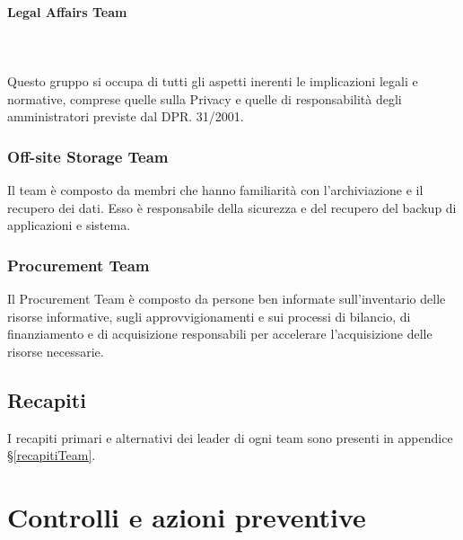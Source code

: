 \documentclass[12pt, a4paper, titlepage]{report}
\newcommand{\myparagraph}[1]{\paragraph{#1}\mbox{} \mbox{}}
\begin{document}
			\myparagraph{Legal Affairs Team}\\
			\\Questo gruppo si occupa di tutti gli aspetti inerenti le implicazioni legali e normative, comprese quelle sulla Privacy e quelle di responsabilità degli amministratori previste dal DPR. 31/2001.		 
			 
			 \subsubsection{Off-site Storage Team}
			 Il team è composto da membri che hanno familiarità con l'archiviazione e il recupero dei dati. Esso è responsabile della sicurezza e del recupero del backup di applicazioni e  sistema.
			
			\subsubsection{Procurement Team}
			Il Procurement Team è composto da persone ben informate sull'inventario delle risorse informative, sugli approvvigionamenti e sui processi di bilancio, di finanziamento e di acquisizione responsabili per accelerare l'acquisizione delle risorse necessarie.			
			
		\subsection{Recapiti} \label{recapiti}
		I recapiti primari e alternativi dei leader di ogni team sono presenti in appendice §\ref{recapitiTeam}.
	
	
	\newpage
	
	\section{Controlli e azioni preventive}
	
\end{document}
